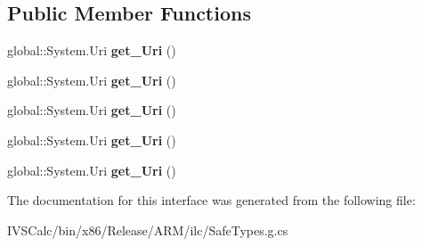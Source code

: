 \subsection*{Public Member Functions}
\begin{DoxyCompactItemize}
\item 
\mbox{\label{interface_windows_1_1_application_model_1_1_activation_1_1_i_protocol_activated_event_args_af81c701cc47d0e98fa0b4e19df63d8ef}} 
global\+::\+System.\+Uri {\bfseries get\+\_\+\+Uri} ()
\item 
\mbox{\label{interface_windows_1_1_application_model_1_1_activation_1_1_i_protocol_activated_event_args_af81c701cc47d0e98fa0b4e19df63d8ef}} 
global\+::\+System.\+Uri {\bfseries get\+\_\+\+Uri} ()
\item 
\mbox{\label{interface_windows_1_1_application_model_1_1_activation_1_1_i_protocol_activated_event_args_af81c701cc47d0e98fa0b4e19df63d8ef}} 
global\+::\+System.\+Uri {\bfseries get\+\_\+\+Uri} ()
\item 
\mbox{\label{interface_windows_1_1_application_model_1_1_activation_1_1_i_protocol_activated_event_args_af81c701cc47d0e98fa0b4e19df63d8ef}} 
global\+::\+System.\+Uri {\bfseries get\+\_\+\+Uri} ()
\item 
\mbox{\label{interface_windows_1_1_application_model_1_1_activation_1_1_i_protocol_activated_event_args_af81c701cc47d0e98fa0b4e19df63d8ef}} 
global\+::\+System.\+Uri {\bfseries get\+\_\+\+Uri} ()
\end{DoxyCompactItemize}


The documentation for this interface was generated from the following file\+:\begin{DoxyCompactItemize}
\item 
I\+V\+S\+Calc/bin/x86/\+Release/\+A\+R\+M/ilc/Safe\+Types.\+g.\+cs\end{DoxyCompactItemize}
